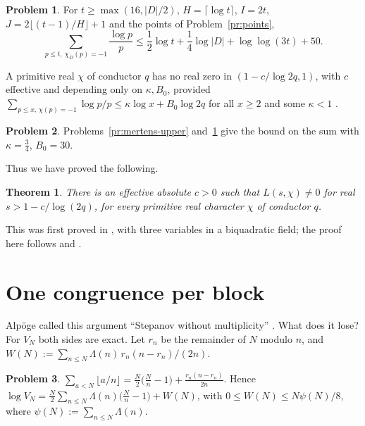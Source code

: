 \documentclass[reqno]{amsart}
\theoremstyle{definition}
\newtheorem{problem}{Problem}[section]
\theoremstyle{plain}
\newtheorem{theorem}{Theorem}[section]
\begin{document}
\begin{problem}\label{pr:density}
For \(t \ge \max(16, \lvert D \rvert/2)\), \(H = \lceil \log t \rceil\), \(I = 2t\), \(J = 2\lfloor (t-1)/H \rfloor + 1\) and the points of Problem~\ref{pr:points},
\[
  \sum_{p \le t,\ \chi_D(p) = -1} \frac{\log p}{p} \le \frac12 \log t + \frac14 \log\lvert D \rvert + \log\log(3t) + 50 .
\]
\end{problem}

A primitive real \(\chi\) of conductor \(q\) has no real zero in \((1 - c/\log 2q, 1)\), with \(c\) effective and depending only on \(\kappa, B_0\), provided \(\sum_{p \le x,\, \chi(p) = -1} \log p/p \le \kappa\log x + B_0\log 2q\) for all \(x \ge 2\) and some \(\kappa < 1\) \cite[Lemma~2, App.~F]{N}.

\begin{problem}\label{pr:kappa}
Problems~\ref{pr:mertens-upper} and~\ref{pr:density} give the bound on the sum with \(\kappa = \frac34\), \(B_0 = 30\).
\end{problem}

Thus we have proved the following.

\begin{theorem}\label{thm:siegel}
There is an effective absolute \(c > 0\) such that \(L(s, \chi) \ne 0\) for real \(s > 1 - c/\log(2q)\), for every primitive real character \(\chi\) of conductor \(q\).
\end{theorem}

This was first proved in \cite{OAI}, with three variables in a biquadratic field; the proof here follows \cite{Gr} and \cite{N}.

\section{One congruence per block}\label{sec:block}

Alpöge called this argument ``Stepanov without multiplicity'' \cite[p.~2]{Alp}.  What does it lose?  For \(V_N\) both sides are exact.  Let \(r_n\) be the remainder of \(N\) modulo \(n\), and \(W(N) := \sum_{n \le N} \Lambda(n)\, r_n(n - r_n)/(2n)\).

\begin{problem}\label{pr:sawtooth}
\(\sum_{a < N} \lfloor a/n \rfloor = \frac N2 \bigl(\frac Nn - 1\bigr) + \frac{r_n(n - r_n)}{2n}\).  Hence \(\log V_N = \frac N2 \sum_{n \le N} \Lambda(n)\bigl(\frac Nn - 1\bigr) + W(N)\), with \(0 \le W(N) \le N\psi(N)/8\), where \(\psi(N) := \sum_{n \le N} \Lambda(n)\).
\end{problem}
\end{document}
